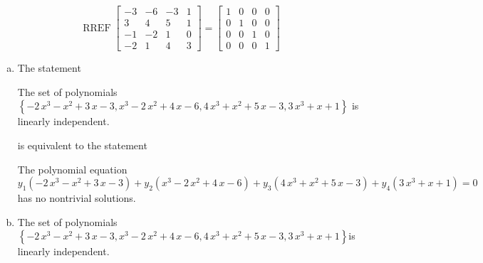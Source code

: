 \begin{exerciseAnswer} 


\[\operatorname{RREF} \left[\begin{array}{cccc}
-3 & -6 & -3 & 1 \\
3 & 4 & 5 & 1 \\
-1 & -2 & 1 & 0 \\
-2 & 1 & 4 & 3
\end{array}\right] = \left[\begin{array}{cccc}
1 & 0 & 0 & 0 \\
0 & 1 & 0 & 0 \\
0 & 0 & 1 & 0 \\
0 & 0 & 0 & 1
\end{array}\right] \]


\begin{enumerate}[(a)]
\item The statement 
\begin{center}\begin{minipage}{0.8\textwidth}
 The set of polynomials \( \left\{ -2 \, x^{3} - x^{2} + 3 \, x - 3 , x^{3} - 2 \, x^{2} + 4 \, x - 6 , 4 \, x^{3} + x^{2} + 5 \, x - 3 , 3 \, x^{3} + x + 1 \right\} \) is linearly independent.
\end{minipage}\end{center}
     is equivalent to the statement 
\begin{center}\begin{minipage}{0.8\textwidth}
 The polynomial equation \[ y_{1} \left( -2 \, x^{3} - x^{2} + 3 \, x - 3 \right) + y_{2} \left( x^{3} - 2 \, x^{2} + 4 \, x - 6 \right) + y_{3} \left( 4 \, x^{3} + x^{2} + 5 \, x - 3 \right) + y_{4} \left( 3 \, x^{3} + x + 1 \right) = 0 \] has no nontrivial solutions. 
\end{minipage}\end{center}
    
\item The set of polynomials \( \left\{ -2 \, x^{3} - x^{2} + 3 \, x - 3 , x^{3} - 2 \, x^{2} + 4 \, x - 6 , 4 \, x^{3} + x^{2} + 5 \, x - 3 , 3 \, x^{3} + x + 1 \right\} \)is linearly independent.
\end{enumerate}
    
\end{exerciseAnswer}
    
